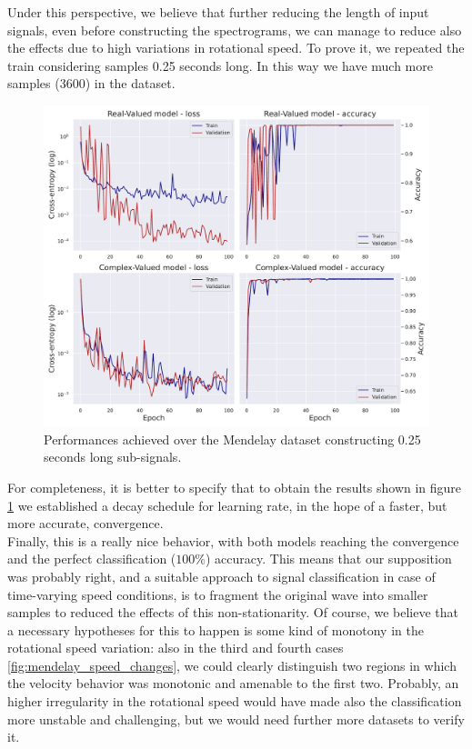 \documentclass[../main.tex]{subfiles}
\begin{document}
Under this perspective, we believe that further reducing the length of input signals, even before constructing the spectrograms, we can manage to reduce also the effects due to high variations in rotational speed. To prove it, we repeated the train considering samples 0.25 seconds long. In this way we have much more samples (3600) in the dataset.
\begin{figure}[ht]
	\centering
	\includegraphics[width=\textwidth]{pictures/mendeley_train_final}
	\caption{Performances achieved over the Mendelay dataset constructing 0.25 seconds long sub-signals.}
	\label{fig:mendeley_train_final}
\end{figure}
For completeness, it is better to specify that to obtain the results shown in figure \ref{fig:mendeley_train_final} we established a decay schedule for learning rate, in the hope of a faster, but more accurate, convergence.\\
Finally, this is a really nice behavior, with both models reaching the convergence and the perfect classification ($100\%$) accuracy. This means that our supposition was probably right, and a suitable approach to signal classification in case of time-varying speed conditions, is to fragment the original wave into smaller samples to reduced the effects of this non-stationarity. Of course, we believe that a necessary hypotheses for this to happen is some kind of monotony in the rotational speed variation: also in the third and fourth cases \ref{fig:mendelay_speed_changes}, we could clearly distinguish two regions in which the velocity behavior was monotonic and amenable to the first two. Probably, an higher irregularity in the rotational speed would have made also the classification more unstable and challenging, but we would need further more datasets to verify it.\\
\end{document}
